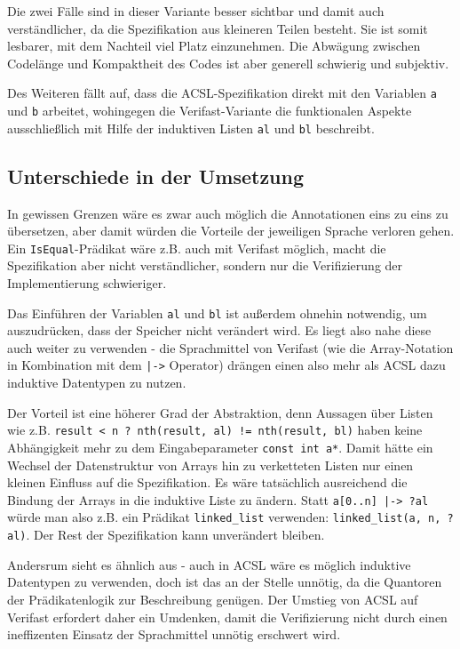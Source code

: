 Die zwei Fälle sind in dieser Variante besser sichtbar und damit auch verständlicher, da die Spezifikation
aus kleineren Teilen besteht. Sie ist somit lesbarer, mit dem Nachteil viel Platz einzunehmen.
Die Abwägung zwischen Codelänge und Kompaktheit des Codes ist aber generell schwierig und subjektiv.

Des Weiteren fällt auf, dass die ACSL-Spezifikation direkt mit den Variablen \lstinline{a} und
\lstinline{b} arbeitet, wohingegen die Verifast-Variante die funktionalen Aspekte ausschließlich
mit Hilfe der induktiven Listen \lstinline{al} und \lstinline{bl} beschreibt. 



\subsection{Unterschiede in der Umsetzung}

In gewissen Grenzen wäre es zwar auch möglich die Annotationen eins zu eins zu übersetzen, aber damit
würden die Vorteile der jeweiligen Sprache verloren gehen. Ein \lstinline{IsEqual}-Prädikat wäre z.B.
auch mit Verifast möglich, macht die Spezifikation aber nicht verständlicher, sondern nur die Verifizierung
der Implementierung schwieriger. 

Das Einführen der Variablen  \lstinline{al} und \lstinline{bl} ist außerdem
ohnehin notwendig, um auszudrücken, dass der Speicher nicht verändert wird. Es liegt also nahe diese auch
weiter zu verwenden - die Sprachmittel von Verifast (wie die Array-Notation in Kombination mit dem
\lstinline{|->} Operator) drängen einen also mehr als ACSL dazu induktive 
Datentypen zu nutzen.

Der Vorteil ist eine höherer Grad der Abstraktion, denn Aussagen über Listen wie z.B.
\lstinline{result < n ? nth(result, al) != nth(result, bl)} haben keine Abhängigkeit mehr zu
dem Eingabeparameter \lstinline{const int a*}. Damit hätte ein Wechsel der Datenstruktur von Arrays
hin zu verketteten Listen nur einen kleinen Einfluss auf die Spezifikation. Es wäre tatsächlich ausreichend
die Bindung der Arrays in die induktive Liste zu ändern. Statt \lstinline{a[0..n] |-> ?al} würde man also
z.B. ein Prädikat \lstinline{linked_list} verwenden: \lstinline{linked_list(a, n, ?al)}.
Der Rest der Spezifikation kann unverändert bleiben.

Andersrum sieht es ähnlich aus - auch in ACSL wäre es möglich induktive Datentypen zu verwenden, doch
ist das an der Stelle unnötig, da die Quantoren der Prädikatenlogik zur Beschreibung genügen. Der Umstieg
von ACSL auf Verifast erfordert daher ein Umdenken, damit die Verifizierung nicht durch einen ineffizenten
Einsatz der Sprachmittel unnötig erschwert wird.



